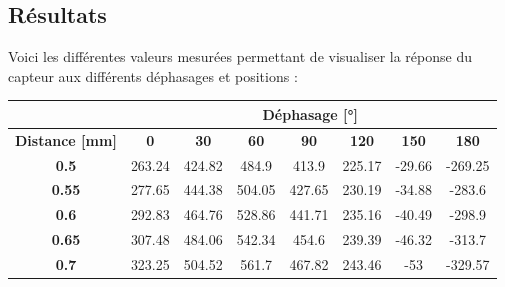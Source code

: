 \subsection{Résultats}


Voici les différentes valeurs mesurées permettant de visualiser la réponse du capteur aux différents
déphasages et positions :

\begin{table}[H]
    \centering
    \begin{tabular}{|c|ccccccc|}
    \hline
    \textbf{}                  & \multicolumn{7}{c|}{\textbf{Déphasage {[}°{]}}}                                                                                                                                                                                 \\ \hline
    \textbf{Distance {[}mm{]}} & \multicolumn{1}{c|}{\textbf{0}} & \multicolumn{1}{c|}{\textbf{30}} & \multicolumn{1}{c|}{\textbf{60}} & \multicolumn{1}{c|}{\textbf{90}} & \multicolumn{1}{c|}{\textbf{120}} & \multicolumn{1}{c|}{\textbf{150}} & \textbf{180} \\ \hline
    \textbf{0.5}               & \multicolumn{1}{c|}{263.24}     & \multicolumn{1}{c|}{424.82}      & \multicolumn{1}{c|}{484.9}       & \multicolumn{1}{c|}{413.9}       & \multicolumn{1}{c|}{225.17}       & \multicolumn{1}{c|}{-29.66}       & -269.25      \\ \hline
    \textbf{0.55}              & \multicolumn{1}{c|}{277.65}     & \multicolumn{1}{c|}{444.38}      & \multicolumn{1}{c|}{504.05}      & \multicolumn{1}{c|}{427.65}      & \multicolumn{1}{c|}{230.19}       & \multicolumn{1}{c|}{-34.88}       & -283.6       \\ \hline
    \textbf{0.6}               & \multicolumn{1}{c|}{292.83}     & \multicolumn{1}{c|}{464.76}      & \multicolumn{1}{c|}{528.86}      & \multicolumn{1}{c|}{441.71}      & \multicolumn{1}{c|}{235.16}       & \multicolumn{1}{c|}{-40.49}       & -298.9       \\ \hline
    \textbf{0.65}              & \multicolumn{1}{c|}{307.48}     & \multicolumn{1}{c|}{484.06}      & \multicolumn{1}{c|}{542.34}      & \multicolumn{1}{c|}{454.6}       & \multicolumn{1}{c|}{239.39}       & \multicolumn{1}{c|}{-46.32}       & -313.7       \\ \hline
    \textbf{0.7}               & \multicolumn{1}{c|}{323.25}     & \multicolumn{1}{c|}{504.52}      & \multicolumn{1}{c|}{561.7}       & \multicolumn{1}{c|}{467.82}      & \multicolumn{1}{c|}{243.46}       & \multicolumn{1}{c|}{-53}          & -329.57      \\ \hline

\end{tabular}
\end{table}
